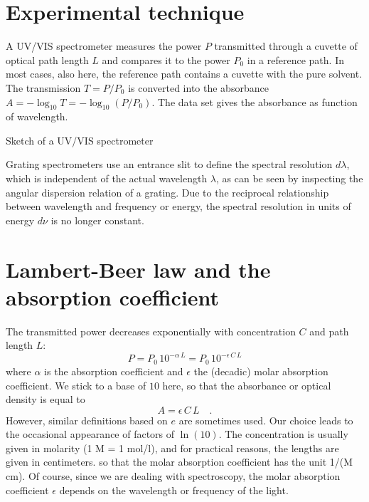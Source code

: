 \section{Experimental technique}

A UV/VIS spectrometer measures the  power $P$ transmitted through a cuvette of optical path length $L$ and compares it to the power $P_0$ in a reference path. In most cases, also here, the reference path contains a cuvette with  the pure solvent. The transmission $T = P / P_0$ is converted into the absorbance $A = - \log_{10} T = - \log_{10} ( P / P_0)$. The data set gives the absorbance as function of wavelength.

\begin{marginfigure}
\caption{Sketch of a UV/VIS spectrometer}
\end{marginfigure}



Grating spectrometers use an entrance slit to define the spectral resolution $d \lambda$, which is independent of the actual wavelength $\lambda$, as can be seen by inspecting the angular dispersion relation of a grating. Due to the reciprocal relationship between wavelength and frequency or energy, the spectral resolution in units of energy $d \nu$ is no longer constant.




\section{Lambert-Beer law and the absorption coefficient}

The transmitted power decreases exponentially with concentration $C$ and path length $L$:
\begin{equation}
 P =  P_0 \, 10^{- \alpha \, L} = P_0 \, 10^{- \epsilon\, C \, L}
\end{equation}
where $\alpha$ is the absorption coefficient and $\epsilon$  the (decadic) molar absorption coefficient. We stick to a base of $10$ here, 
so that the absorbance or optical density is equal to 
\begin{equation}
 A = \epsilon\, C \, L \quad.
\end{equation}
However, similar definitions based on $e$ are sometimes used. Our choice leads to the occasional appearance of factors of $\ln(10)$. The concentration is usually given in molarity (1 M = 1 mol/l), and for practical reasons, the lengths are given in centimeters.
so that the molar absorption coefficient has the unit 1/(M cm). Of course, since we are dealing with spectroscopy, the molar absorption coefficient $\epsilon$ depends on the wavelength or frequency of the light.


